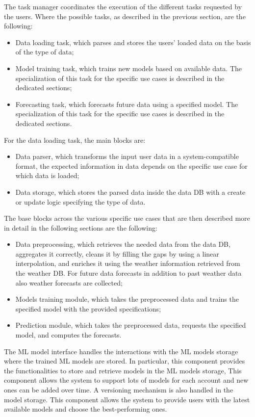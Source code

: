 The task manager coordinates the execution of the different tasks requested by the users.
Where the possible tasks, as described in the previous section, are the following:
\begin{itemize}
  \item Data loading task, which parses and stores the users' loaded data on the basis of the type of data;
  \item Model training task, which trains new models based on available data. The specialization of this task for the specific use cases is described in the dedicated sections;
  \item Forecasting task, which forecasts future data using a specified model. The specialization of this task for the specific use cases is described in the dedicated sections.
\end{itemize}

For the data loading task, the main blocks are:
\begin{itemize}
  \item Data parser, which transforms the input user data in a system-compatible format, the expected information in data depends on the specific use case for which data is loaded;
  \item Data storage, which stores the parsed data inside the data DB with a create or update logic specifying the type of data.
\end{itemize}

The base blocks across the various specific use cases that are then described more in detail in the following sections are the following:
\begin{itemize}
  \item Data preprocessing, which retrieves the needed data from the data DB, aggregates it correctly, cleans it by filling the gaps by using a linear interpolation, and enriches it using the weather information retrieved from the weather DB. For future data forecasts in addition to past weather data also weather forecasts are collected;
  \item Models training module, which takes the preprocessed data and trains the specified model with the provided specifications;
  \item Prediction module, which takes the preprocessed data, requests the specified model, and computes the forecasts.
\end{itemize}

The ML model interface handles the interactions with the ML models storage where the trained ML models are stored.
In particular, this component provides the functionalities to store and retrieve models in the ML models storage,
This component allows the system to support lots of models for each account and new ones can be added over time.
A versioning mechanism is also handled in the model storage.
This component allows the system to provide users with the latest available models and choose the best-performing ones.

